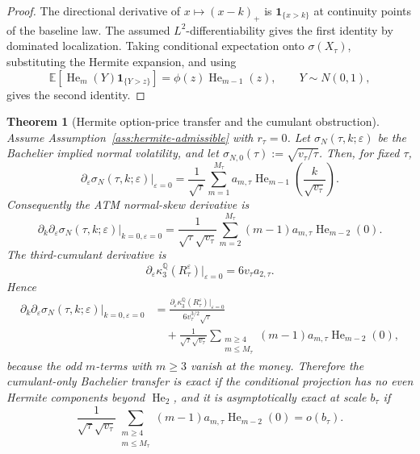 \documentclass[11pt,a4paper]{amsart}
\theoremstyle{plain}
\newtheorem{theorem}{Theorem}[section]
\theoremstyle{definition}
\theoremstyle{remark}
\DeclareMathOperator{\He}{He}
\newcommand{\QQ}{\mathbb{Q}}
\newcommand{\EE}{\mathbb{E}}
\newcommand{\one}{\mathbf{1}}
\begin{document}
\begin{proof}
The directional derivative of \(x\mapsto(x-k)_+\) is \(\one_{\{x>k\}}\) at continuity points of
the baseline law.  The assumed \(L^2\)-differentiability gives the first identity by dominated
localization.  Taking conditional expectation onto \(\sigma(X_\tau)\), substituting the Hermite
expansion, and using
\[
        \EE[\He_m(Y)\one_{\{Y>z\}}]=\phi(z)\He_{m-1}(z),
        \qquad
        Y\sim N(0,1),
\]
gives the second identity.
\end{proof}

\begin{theorem}[Hermite option-price transfer and the cumulant obstruction]\label{thm:hermite-option-transfer}
Assume Assumption~\ref{ass:hermite-admissible} with \(r_\tau=0\).  Let
\(\sigma_N(\tau,k;\varepsilon)\) be the Bachelier implied normal volatility, and let
\(\sigma_{N,0}(\tau):=\sqrt{v_\tau/\tau}\).  Then, for fixed \(\tau\),
\[
        \partial_\varepsilon\sigma_N(\tau,k;\varepsilon)\big|_{\varepsilon=0}
        =
        \frac{1}{\sqrt\tau}
        \sum_{m=1}^{M_\tau}a_{m,\tau}\He_{m-1}\!\left(\frac{k}{\sqrt{v_\tau}}\right).
\]
Consequently the ATM normal-skew derivative is
\[
        \partial_k\partial_\varepsilon\sigma_N(\tau,k;\varepsilon)\big|_{k=0,\varepsilon=0}
        =
        \frac{1}{\sqrt\tau\sqrt{v_\tau}}
        \sum_{m=2}^{M_\tau}(m-1)a_{m,\tau}\He_{m-2}(0).
\]
The third-cumulant derivative is
\[
        \partial_\varepsilon \kappa_3^\QQ(R_\tau^\varepsilon)\big|_{\varepsilon=0}
        =
        6v_\tau a_{2,\tau}.
\]
Hence
\[
\begin{aligned}
        \partial_k\partial_\varepsilon\sigma_N(\tau,k;\varepsilon)\big|_{k=0,\varepsilon=0}
        &=
        \frac{\partial_\varepsilon \kappa_3^\QQ(R_\tau^\varepsilon)|_{\varepsilon=0}}
        {6v_\tau^{3/2}\sqrt\tau} \\
        &\quad+
        \frac{1}{\sqrt\tau\sqrt{v_\tau}}
        \sum_{\substack{m\ge4\\ m\le M_\tau}}
        (m-1)a_{m,\tau}\He_{m-2}(0),
\end{aligned}
\]
because the odd \(m\)-terms with \(m\ge3\) vanish at the money.  Therefore the cumulant-only
Bachelier transfer is exact if the conditional projection has no even Hermite components beyond
\(\He_2\), and it is asymptotically exact at scale \(b_\tau\) if
\[
        \frac{1}{\sqrt\tau\sqrt{v_\tau}}
        \sum_{\substack{m\ge4\\ m\le M_\tau}}
        (m-1)a_{m,\tau}\He_{m-2}(0)
        =
        o(b_\tau).
\]
\end{theorem}
\end{document}
